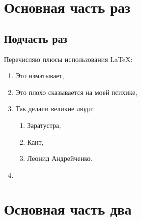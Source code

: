 \section{Основная часть раз}
\lipsum[1] \cite{Labov1972}
\subsection{Подчасть раз}
Перечисляю плюсы использования \LaTeX: 
\begin{enumerate}
	\item Это изматывает,
	\item Это плохо сказывается на моей психике, 
	\item Так делали великие люди: 
	\begin{enumerate}
		\item Заратустра,
		\item Кант,
		\item Леонид Андрейченко.
	\end{enumerate}
	\item \lipsum[2][1-3]
\end{enumerate}

\section{Основная часть два}
\lipsum[2-3] 

